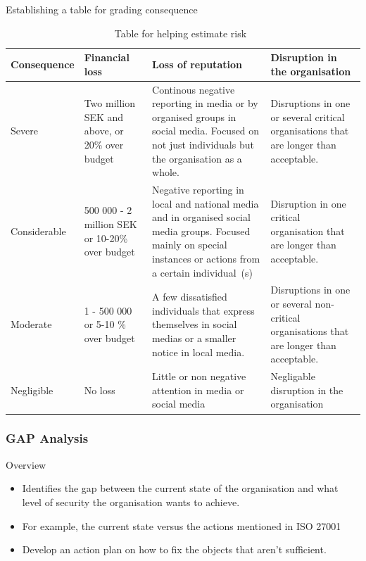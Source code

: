 \documentclass{beamer}
\begin{document}
\begin{frame}{Establishing a table for grading consequence}{\insertsubsubsectionhead}
  \begin{table}
    \tiny
    \caption{Table for helping estimate risk~\cite{msb_metodstod}}
    \begin{tabularx}{\textwidth}{X | X | X | X}
    Consequence & Financial loss & Loss of reputation & Disruption in the
    organisation\\ 
    \toprule

    Severe & Two million SEK and above, or 20\% over budget & Continous negative
    reporting in media or by organised groups in social media. Focused on not
    just individuals but the organisation as a whole.& Disruptions in one or
    several critical organisations that are longer than acceptable.\\

    \midrule
    Considerable & 500 000 - 2 million SEK or 10-20\% over budget & Negative
    reporting in local and national media and in organised social media groups.
    Focused mainly on special instances or actions from a certain individual~(s)
    & Disruption in one critical organisation that are longer than acceptable.
    \\ 
    \midrule
    Moderate & 1 - 500 000 or 5-10 \% over budget & A few dissatisfied
    individuals that express themselves in social medias or a smaller notice in
    local media.& Disruptions in one or several non-critical organisations that
    are longer than acceptable.\\ 
    \midrule
    Negligible & No loss & Little or non negative attention in media or social
    media & Negligable disruption in the organisation\\ 
    \bottomrule
  \end{tabularx}
  \end{table}
\end{frame}

\subsubsection{GAP Analysis}
\begin{frame}{Overview}{\insertsubsubsectionhead}
  \begin{itemize}
    \item Identifies the gap between the current state of the organisation and
      what level of security the organisation wants to achieve.
    \item For example, the current state versus the actions mentioned in ISO
      27001~\cite[Bilaga A]{iso27001}
    \item Develop an action plan on how to fix the objects that aren't 
      sufficient.
  \end{itemize}
\end{frame}
\end{document}
